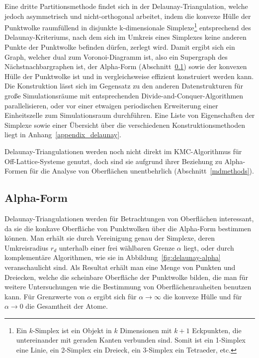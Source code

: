 Eine dritte Partitionsmethode findet sich in der Delaunay-Triangulation, welche jedoch asymmetrisch und nicht-orthogonal arbeitet, indem die konvexe Hülle der Punktwolke raumfüllend in disjunkte k-dimensionale Simplexe\footnote{Ein $k$-Simplex ist ein Objekt in $k$ Dimensionen mit $k+1$ Eckpunkten, die untereinander mit geraden Kanten verbunden sind. Somit ist ein 1-Simplex eine Linie, ein 2-Simplex ein Dreieck, ein 3-Simplex ein Tetraeder, etc.} entsprechend des Delaunay-Kriteriums, nach dem sich im Umkreis eines Simplexes keine anderen Punkte der Punktwolke befinden dürfen, zerlegt wird.
Damit ergibt sich ein Graph, welcher dual zum Voronoi-Diagramm ist, also ein Supergraph des Nächstnachbargraphen ist, der Alpha-Form (Abschnitt~\ref{dataalphaform}) sowie der konvexen Hülle der Punktwolke ist und in  vergleichsweise effizient konstruiert werden kann.
Die Konstruktion lässt sich im Gegensatz zu den anderen Datenstrukturen für große Simulationsräume mit entsprechenden Divide-and-Conquer-Algorithmen parallelisieren, oder vor einer etwaigen periodischen Erweiterung einer Einheitszelle zum Simulationsraum durchführen.
Eine Liste von Eigenschaften der Simplexe sowie einer Übersicht über die verschiedenen Konstruktionsmethoden liegt in Anhang~\ref{appendix_delaunay}.

Delaunay-Triangulationen werden noch nicht direkt im KMC-Algorithmus für Off-Lattice-Systeme genutzt, doch sind sie aufgrund ihrer Beziehung zu Alpha-Formen für die Analyse von Oberflächen unentbehrlich (Abschnitt~\ref{mdmethods}).

\subsection{Alpha-Form}
\label{dataalphaform}

Delaunay-Triangulationen werden für Betrachtungen von Oberflächen interessant, da sie die konkave Oberfläche von Punktwolken über die Alpha-Form bestimmen können.
Man erhält sie durch Vereinigung genau der Simplexe, deren Umkreisradius $r_d$ unterhalb einer frei wählbaren Grenze $\alpha$ liegt, oder durch komplementäre Algorithmen, wie sie in Abbildung~\ref{fig:delaunay-alpha} veranschaulicht sind.
Als Resultat erhält man eine Menge von Punkten und Dreiecken, welche die scheinbare Oberfläche der Punktwolke bilden, die man für weitere Untersuchungen wie die Bestimmung von Oberflächenrauheiten benutzen kann.
Für Grenzwerte von $\alpha$ ergibt sich für $\alpha \rightarrow \infty$ die konvexe Hülle und für $\alpha \rightarrow 0$ die Gesamtheit der Atome.


